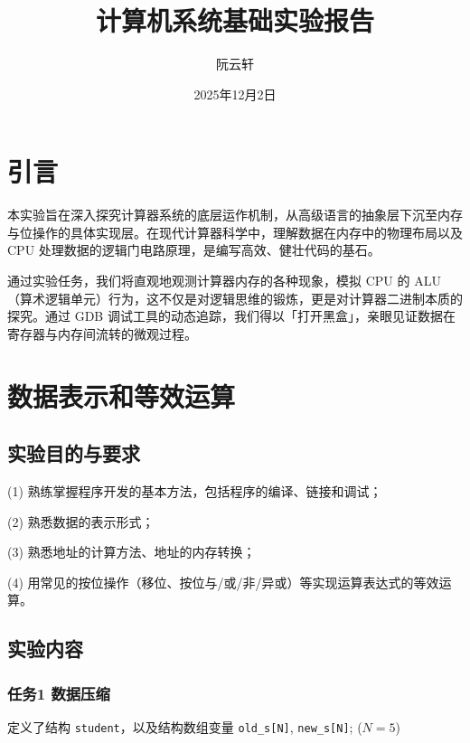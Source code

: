 \documentclass[supercite]{Experimental_Report}
\title{计算机系统基础实验报告}
\author{阮云轩}
\date{2025年12月2日}
\theoremstyle{definition}
\begin{document}
	
	\maketitle
	
	\clearpage
	
	
	\tableofcontents[level=2]
	
	\clearpage
	
	
	\listoflistings
	
	\section{引言}
	本实验旨在深入探究计算器系统的底层运作机制，从高级语言的抽象层下沉至内存与位操作的具体实现层。在现代计算器科学中，理解数据在内存中的物理布局以及 CPU 处理数据的逻辑门电路原理，是编写高效、健壮代码的基石。
	
	通过实验任务，我们将直观地观测计算器内存的各种现象，模拟 CPU 的 ALU（算术逻辑单元）行为，这不仅是对逻辑思维的锻炼，更是对计算器二进制本质的探究。通过 GDB 调试工具的动态追踪，我们得以「打开黑盒」，亲眼见证数据在寄存器与内存间流转的微观过程。
	
	
	\section{数据表示和等效运算}
	\subsection{实验目的与要求}
	(1) 熟练掌握程序开发的基本方法，包括程序的编译、链接和调试；
	
	(2) 熟悉数据的表示形式；
	
	(3) 熟悉地址的计算方法、地址的内存转换；
	
	(4) 用常见的按位操作（移位、按位与/或/非/异或）等实现运算表达式的等效运算。
	
	\subsection{实验内容}
	\subsubsection*{任务1 数据压缩}
	
	定义了结构 \texttt{student}，以及结构数组变量 \texttt{old\_s[N]}, \texttt{new\_s[N]}; ($N=5$)
	
\end{document}
